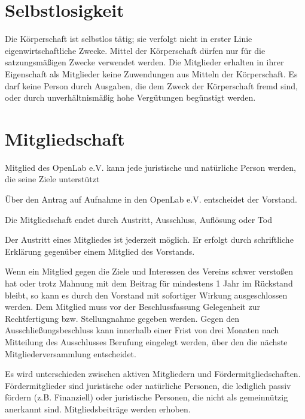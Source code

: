 \documentclass[a5paper, ngerman, 10pt]{scrreprt}
\begin{document}
\section{Selbstlosigkeit}
Die Körperschaft ist selbstlos tätig; sie verfolgt nicht in erster Linie
eigenwirtschaftliche Zwecke. Mittel der Körperschaft dürfen nur für die
satzungsmäßigen Zwecke verwendet werden. Die Mitglieder erhalten in ihrer
Eigenschaft als Mitglieder keine Zuwendungen aus Mitteln der Körperschaft. Es
darf keine Person durch Ausgaben, die dem Zweck der Körperschaft fremd sind,
oder durch unverhältnismäßig hohe Vergütungen begünstigt werden.


\section{Mitgliedschaft}
\begin{compactenum}[(1)]
    \item Mitglied des OpenLab e.V. kann jede juristische und natürliche Person
        werden, die seine Ziele unterstützt
    \item Über den Antrag auf Aufnahme in den OpenLab e.V. entscheidet der
        Vorstand.
    \item Die Mitgliedschaft endet durch Austritt, Ausschluss, Auflösung oder
        Tod
    \item Der Austritt eines Mitgliedes ist jederzeit möglich. Er erfolgt durch
        schriftliche Erklärung gegenüber einem Mitglied des Vorstands.
    \item Wenn ein Mitglied gegen die Ziele und Interessen des Vereins schwer
        verstoßen hat oder trotz Mahnung mit dem Beitrag für mindestens 1 Jahr
        im Rückstand bleibt, so kann es durch den Vorstand mit sofortiger
        Wirkung ausgeschlossen werden. Dem Mitglied muss vor der
        Beschlussfassung Gelegenheit zur Rechtfertigung bzw. Stellungnahme
        gegeben werden. Gegen den Ausschließungsbeschluss kann innerhalb einer
        Frist von drei Monaten nach Mitteilung des Ausschlusses Berufung
        eingelegt werden, über den die nächste Mitgliederversammlung
        entscheidet.
    \item Es wird unterschieden zwischen aktiven Mitgliedern und
        Fördermitgliedschaften.  Fördermitglieder sind juristische oder
        natürliche Personen, die lediglich passiv fördern (z.B. Finanziell)
        oder juristische Personen, die nicht als gemeinnützig anerkannt sind.
        Mitgliedsbeiträge werden erhoben.
\end{compactenum}
\end{document}
